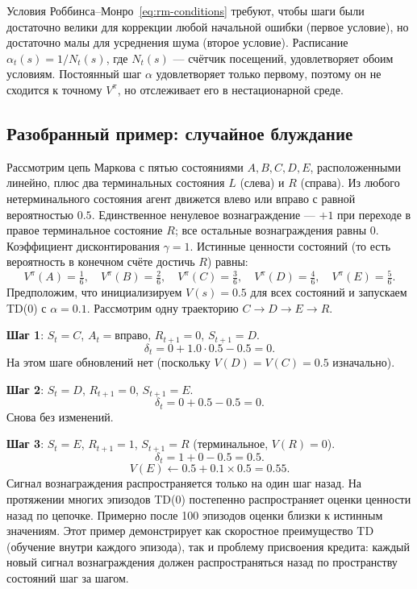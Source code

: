 Условия Роббинса--Монро~\eqref{eq:rm-conditions} требуют, чтобы шаги были достаточно велики для коррекции любой начальной ошибки (первое условие), но достаточно малы для усреднения шума (второе условие).  Расписание $\alpha_t(s) = 1/N_t(s)$, где $N_t(s)$ --- счётчик посещений, удовлетворяет обоим условиям.  Постоянный шаг $\alpha$ удовлетворяет только первому, поэтому он не сходится к точному $V^\pi$, но отслеживает его в нестационарной среде.

\subsection{Разобранный пример: случайное блуждание}

\begin{example}
\label{ex:random-walk}
Рассмотрим цепь Маркова с пятью состояниями $A, B, C, D, E$, расположенными линейно, плюс два терминальных состояния $L$ (слева) и $R$ (справа).  Из любого нетерминального состояния агент движется влево или вправо с равной вероятностью $0.5$.  Единственное ненулевое вознаграждение --- $+1$ при переходе в правое терминальное состояние $R$; все остальные вознаграждения равны $0$.  Коэффициент дисконтирования $\gamma = 1$.  Истинные ценности состояний (то есть вероятность в конечном счёте достичь $R$) равны:
\[
V^\pi(A)=\tfrac{1}{6}, \quad V^\pi(B)=\tfrac{2}{6}, \quad V^\pi(C)=\tfrac{3}{6}, \quad V^\pi(D)=\tfrac{4}{6}, \quad V^\pi(E)=\tfrac{5}{6}.
\]
Предположим, что инициализируем $V(s) = 0.5$ для всех состояний и запускаем TD(0) с $\alpha = 0.1$.  Рассмотрим одну траекторию $C \to D \to E \to R$.

\textbf{Шаг 1}: $S_t = C$, $A_t = \mbox{вправо}$, $R_{t+1} = 0$, $S_{t+1} = D$.
\[
\delta_t = 0 + 1.0 \cdot 0.5 - 0.5 = 0.
\]
На этом шаге обновлений нет (поскольку $V(D) = V(C) = 0.5$ изначально).

\textbf{Шаг 2}: $S_t = D$, $R_{t+1} = 0$, $S_{t+1} = E$.
\[
\delta_t = 0 + 0.5 - 0.5 = 0.
\]
Снова без изменений.

\textbf{Шаг 3}: $S_t = E$, $R_{t+1} = 1$, $S_{t+1} = R$ (терминальное, $V(R)=0$).
\[
\delta_t = 1 + 0 - 0.5 = 0.5.
\]
\[
V(E) \leftarrow 0.5 + 0.1 \times 0.5 = 0.55.
\]
Сигнал вознаграждения распространяется только на один шаг назад.  На протяжении многих эпизодов TD(0) постепенно распространяет оценки ценности назад по цепочке.  Примерно после 100 эпизодов оценки близки к истинным значениям.  Этот пример демонстрирует как скоростное преимущество TD (обучение внутри каждого эпизода), так и проблему присвоения кредита: каждый новый сигнал вознаграждения должен распространяться назад по пространству состояний шаг за шагом.
\end{example}

